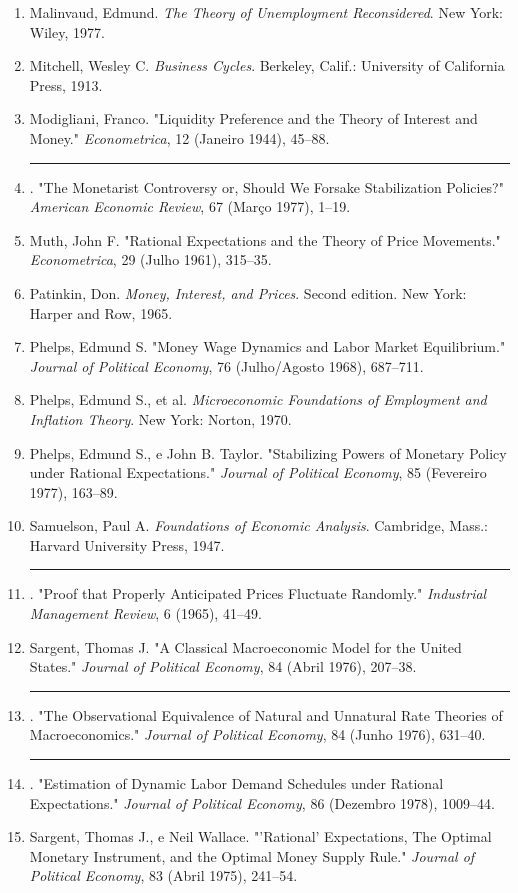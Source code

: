 \documentclass[12pt]{article}
\begin{document}
\begin{enumerate}
    \item Malinvaud, Edmund. \textit{The Theory of Unemployment Reconsidered}. New York: Wiley, 1977.
    \item Mitchell, Wesley C. \textit{Business Cycles}. Berkeley, Calif.: University of California Press, 1913.
    \item Modigliani, Franco. "Liquidity Preference and the Theory of Interest and Money." \textit{Econometrica}, 12 (Janeiro 1944), 45--88.
    \item \rule{1cm}{0.4pt}. "The Monetarist Controversy or, Should We Forsake Stabilization Policies?" \textit{American Economic Review}, 67 (Março 1977), 1--19.
    \item Muth, John F. "Rational Expectations and the Theory of Price Movements." \textit{Econometrica}, 29 (Julho 1961), 315--35.
    \item Patinkin, Don. \textit{Money, Interest, and Prices}. Second edition. New York: Harper and Row, 1965.
    \item Phelps, Edmund S. "Money Wage Dynamics and Labor Market Equilibrium." \textit{Journal of Political Economy}, 76 (Julho/Agosto 1968), 687--711.
    \item Phelps, Edmund S., et al. \textit{Microeconomic Foundations of Employment and Inflation Theory}. New York: Norton, 1970.
    \item Phelps, Edmund S., e John B. Taylor. "Stabilizing Powers of Monetary Policy under Rational Expectations." \textit{Journal of Political Economy}, 85 (Fevereiro 1977), 163--89.
    \item Samuelson, Paul A. \textit{Foundations of Economic Analysis}. Cambridge, Mass.: Harvard University Press, 1947.
    \item \rule{1cm}{0.4pt}. "Proof that Properly Anticipated Prices Fluctuate Randomly." \textit{Industrial Management Review}, 6 (1965), 41--49.
    \item Sargent, Thomas J. "A Classical Macroeconomic Model for the United States." \textit{Journal of Political Economy}, 84 (Abril 1976), 207--38.
    \item \rule{1cm}{0.4pt}. "The Observational Equivalence of Natural and Unnatural Rate Theories of Macroeconomics." \textit{Journal of Political Economy}, 84 (Junho 1976), 631--40.
    \item \rule{1cm}{0.4pt}. "Estimation of Dynamic Labor Demand Schedules under Rational Expectations." \textit{Journal of Political Economy}, 86 (Dezembro 1978), 1009--44.
    \item Sargent, Thomas J., e Neil Wallace. "'Rational' Expectations, The Optimal Monetary Instrument, and the Optimal Money Supply Rule." \textit{Journal of Political Economy}, 83 (Abril 1975), 241--54.

\end{enumerate}
\end{document}
